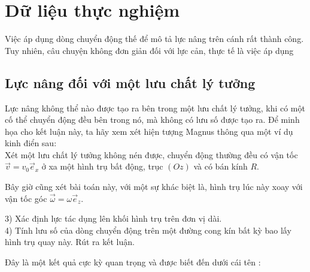\documentclass[KHI_DONG_HOC.tex]{subfiles}
\begin{document}
\section{Dữ liệu thực nghiệm}

	Việc áp dụng dòng chuyển động thế để mô tả lực nâng trên cánh rất thành công. Tuy nhiên, câu chuyện không đơn giản đối với lực cản, thực tế là việc áp dụng 

\subsection{Lực nâng đối với một lưu chất lý tưởng}

	Lực nâng không thể nào được tạo ra bên trong một lưu chất lý tưởng, khi có một cố thể chuyển động đều bên trong nó, mà không có lưu số được tạo ra. Để minh họa cho kết luận này, ta hãy xem xét hiện tượng Magnus thông qua một ví dụ kinh điển sau:\\

	 Xét một lưu chất lý tưởng không nén được, chuyển động thường đều có vận tốc $\vec v = {v_0}{\vec e _x}$ ở xa một hình trụ bất động, trục $(Oz)$ và có bán kính $R$.\\

	    \leftskip=1cm
	    
		    \leftskip=0cm
		    {Bây giờ cũng xét bài toán này, với một sự khác biệt là, hình trụ lúc này xoay với vận tốc góc $\vec \omega = {\omega}{\vec e _z}$.}
		    
		    \leftskip=1cm
		    3) Xác định lực tác dụng lên khối hình trụ trên đơn vị dài.\\
		    4) Tính lưu số của dòng chuyển động trên một đường cong kín bất kỳ bao lấy hình trụ quay này. Rút ra kết luận.\\
		
		\leftskip=0pt

	  Đây là một kết quả cực kỳ quan trọng và được biết đến dưới cái tên  :\\
	
\end{document}
